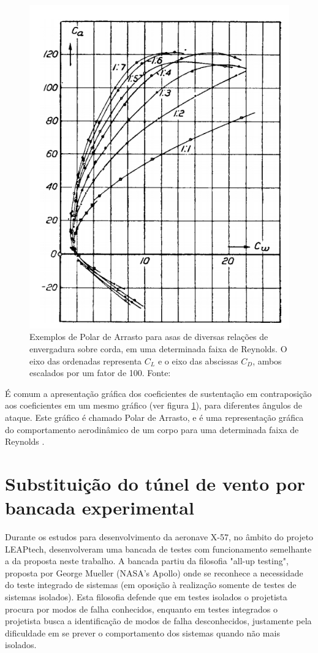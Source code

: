 \begin{figure}[H]
    \centering
    \includegraphics[width=.8\linewidth]{figuras/outras/drag_polar_prandtl.png}
    \caption{Exemplos de Polar de Arrasto para asas de diversas relações de envergadura sobre corda, em uma determinada faixa de Reynolds. O eixo das ordenadas representa $C_L$ e o eixo das abscissas $C_D$, ambos escalados por um fator de 100. Fonte: \cite{prandtl1921applications}}
    \label{fig:drag_polar_prandtl}
\end{figure}

É comum a apresentação gráfica dos coeficientes de sustentação em contraposição aos coeficientes em um mesmo gráfico (ver figura \ref{fig:drag_polar_prandtl}), para diferentes ângulos de ataque. Este gráfico é chamado Polar de Arrasto, e é uma representação gráfica do comportamento aerodinâmico de um corpo para uma determinada faixa de Reynolds \citep{prandtl1921applications}.

\section{Substituição do túnel de vento por bancada experimental}

Durante os estudos para desenvolvimento da aeronave X-57, no âmbito do projeto LEAPtech, \cite{murray2016leaptech} desenvolveram uma bancada de testes com funcionamento semelhante a da proposta neste trabalho. A bancada partiu da filosofia "all-up testing", proposta por George Mueller (NASA's Apollo) onde se reconhece a necessidade do teste integrado de sistemas (em oposição à realização somente de testes de sistemas isolados). Esta filosofia defende que em testes isolados o projetista procura por modos de falha conhecidos, enquanto em testes integrados o projetista busca a identificação de modos de falha desconhecidos, justamente pela dificuldade em se prever o comportamento dos sistemas quando não mais isolados. 

